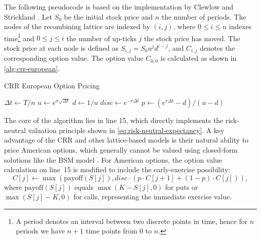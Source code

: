 \documentclass[english,12pt,a4paper,pdftex,sci,utf8]{aaltothesis}
\begin{document}
The following pseudocode is based on the implementation by Clewlow and Strickland \cite{clewlow1998implementing}. Let $S_0$ be the initial stock price and $n$ the number of periods. The nodes of the recombining lattice are indexed by $(i,j)$, where $0 \leq i \leq n$ indexes time\footnote{A period denotes an interval between two discrete points in time, hence for $n$ periods we have $n+1$ time points from $0$ to $n$.} and $0 \le j \le i$ the number of up-ticks $j$ the stock price has moved. The stock price at each node is defined as $S_{i,j} = S_0u^jd^{i-j}$, and $C_{i,j}$ denotes the corresponding option value. The option value  $C_{0,0}$ is calculated as shown in \cref{alg:crr-european}.

\begin{algorithm}
\LinesNumbered
\caption{CRR European Option Pricing}
\label{alg:crr-european}

$\Delta t \gets T/n$\;
$u \gets e^{\sigma\sqrt{\Delta t}}$\;
$d \gets 1/u$\;
$disc \gets e^{-r\Delta t}$\;
$p \gets (e^{r\Delta t} - d)/(u - d)$\;

\BlankLine
{}

\BlankLine
{}

\BlankLine
{}
 
\;
\end{algorithm}

The core of the algorithm lies in line 15, which directly implements the risk-neutral valuation principle shown in \cref{eq:risk-neutral-expectancy}. A key advantage of the CRR and other lattice-based models is their natural ability to price American options, which generally cannot be valued using closed-form solutions like the BSM model \cite{wilmott2013paul}. For American options, the option value calculation on line~15 is modified to include the early-exercise possibility:
\begin{equation*}
C[j] \gets \max(\text{payoff}(S[j]), disc \cdot (p \cdot C[j+1] + (1-p) \cdot C[j])),
\end{equation*}
where $\text{payoff}(S[j])$ equals $\max(K - S[j], 0)$ for puts or $\max(S[j] - K, 0)$ for calls, representing the immediate exercise value.
\end{document}
